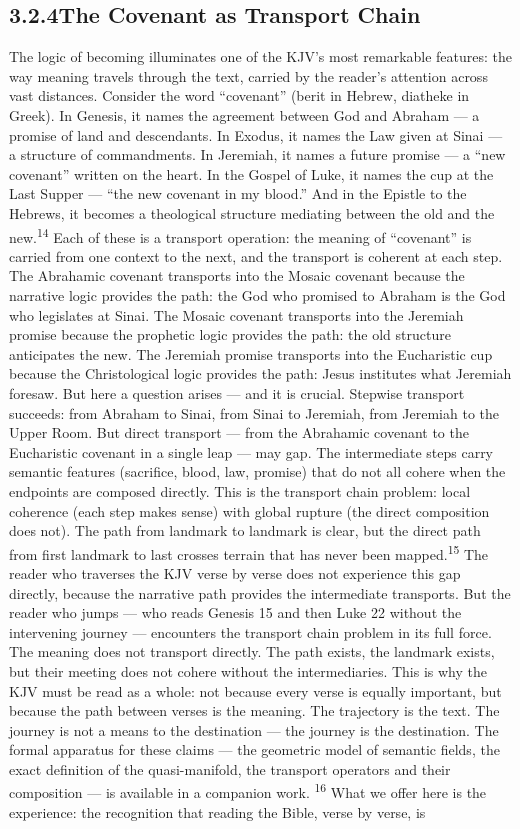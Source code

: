 \subsection{3.2.4\quad The Covenant as Transport Chain}

The logic of becoming illuminates one of the KJV’s most remarkable features: the way meaning travels through the text, carried by the reader’s attention across vast distances. Consider the word “covenant” (berit in Hebrew, diatheke in Greek). In Genesis, it names the agreement between God and Abraham — a promise of land and descendants. In Exodus, it names the Law given at Sinai — a structure of commandments. In Jeremiah, it names a future promise — a “new covenant” written on the heart. In the Gospel of Luke, it names the cup at the Last Supper — “the new covenant in my blood.” And in the Epistle to the Hebrews, it becomes a theological structure mediating between the old and the new.\textsuperscript{14} Each of these is a transport operation: the meaning of “covenant” is carried from one context to the next, and the transport is coherent at each step. The Abrahamic covenant transports into the Mosaic covenant because the narrative logic provides the path: the God who promised to Abraham is the God who legislates at Sinai. The Mosaic covenant transports into the Jeremiah promise because the prophetic logic provides the path: the old structure anticipates the new. The Jeremiah promise transports into the Eucharistic cup because the Christological logic provides the path: Jesus institutes what Jeremiah foresaw. But here a question arises — and it is crucial. Stepwise transport succeeds: from Abraham to Sinai, from Sinai to Jeremiah, from Jeremiah to the Upper Room. But direct transport — from the Abrahamic covenant to the Eucharistic covenant in a single leap — may gap. The intermediate steps carry semantic features (sacrifice, blood, law, promise) that do not all cohere when the endpoints are composed directly. This is the transport chain problem: local coherence (each step makes sense) with global rupture (the direct composition does not). The path from landmark to landmark is clear, but the direct path from first landmark to last crosses terrain that has never been mapped.\textsuperscript{15} The reader who traverses the KJV verse by verse does not experience this gap directly, because the narrative path provides the intermediate transports. But the reader who jumps — who reads Genesis 15 and then Luke 22 without the intervening journey — encounters the transport chain problem in its full force. The meaning does not transport directly. The path exists, the landmark exists, but their meeting does not cohere without the intermediaries. This is why the KJV must be read as a whole: not because every verse is equally important, but because the path between verses is the meaning. The trajectory is the text. The journey is not a means to the destination — the journey is the destination. The formal apparatus for these claims — the geometric model of semantic fields, the exact definition of the quasi-manifold, the transport operators and their composition — is available in a companion work. \textsuperscript{16} What we offer here is the experience: the recognition that reading the Bible, verse by verse, is

